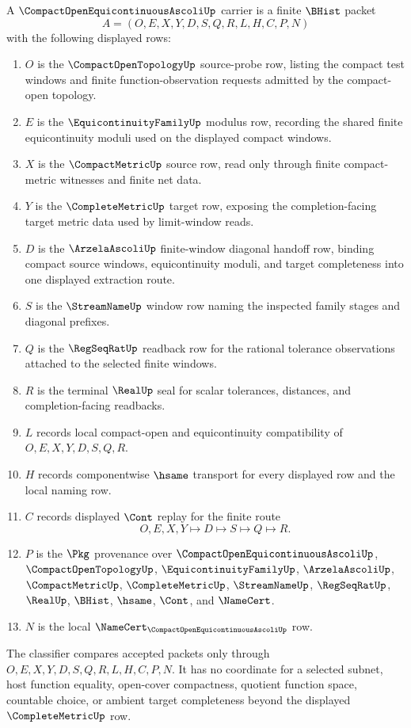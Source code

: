 \begin{definition}
\label{def:compact-open-equicontinuous-ascoli-carrier}
A $\CompactOpenEquicontinuousAscoliUp$ carrier is a finite $\BHist$ packet
$$
A=(O,E,X,Y,D,S,Q,R,L,H,C,P,N)
$$
with the following displayed rows:
\begin{enumerate}
\item $O$ is the $\CompactOpenTopologyUp$ source-probe row, listing the compact test windows and finite function-observation requests admitted by the compact-open topology.
\item $E$ is the $\EquicontinuityFamilyUp$ modulus row, recording the shared finite equicontinuity moduli used on the displayed compact windows.
\item $X$ is the $\CompactMetricUp$ source row, read only through finite compact-metric witnesses and finite net data.
\item $Y$ is the $\CompleteMetricUp$ target row, exposing the completion-facing target metric data used by limit-window reads.
\item $D$ is the $\ArzelaAscoliUp$ finite-window diagonal handoff row, binding compact source windows, equicontinuity moduli, and target completeness into one displayed extraction route.
\item $S$ is the $\StreamNameUp$ window row naming the inspected family stages and diagonal prefixes.
\item $Q$ is the $\RegSeqRatUp$ readback row for the rational tolerance observations attached to the selected finite windows.
\item $R$ is the terminal $\RealUp$ seal for scalar tolerances, distances, and completion-facing readbacks.
\item $L$ records local compact-open and equicontinuity compatibility of $O,E,X,Y,D,S,Q,R$.
\item $H$ records componentwise $\hsame$ transport for every displayed row and the local naming row.
\item $C$ records displayed $\Cont$ replay for the finite route
$$
O,E,X,Y \longmapsto D \longmapsto S \longmapsto Q \longmapsto R .
$$
\item $P$ is the $\Pkg$ provenance over $\CompactOpenEquicontinuousAscoliUp$, $\CompactOpenTopologyUp$, $\EquicontinuityFamilyUp$, $\ArzelaAscoliUp$, $\CompactMetricUp$, $\CompleteMetricUp$, $\StreamNameUp$, $\RegSeqRatUp$, $\RealUp$, $\BHist$, $\hsame$, $\Cont$, and $\NameCert$.
\item $N$ is the local $\NameCert_{\CompactOpenEquicontinuousAscoliUp}$ row.
\end{enumerate}
The classifier compares accepted packets only through $O,E,X,Y,D,S,Q,R,L,H,C,P,N$. It has no coordinate for a selected subnet, host function equality, open-cover compactness, quotient function space, countable choice, or ambient target completeness beyond the displayed $\CompleteMetricUp$ row.
\end{definition}

